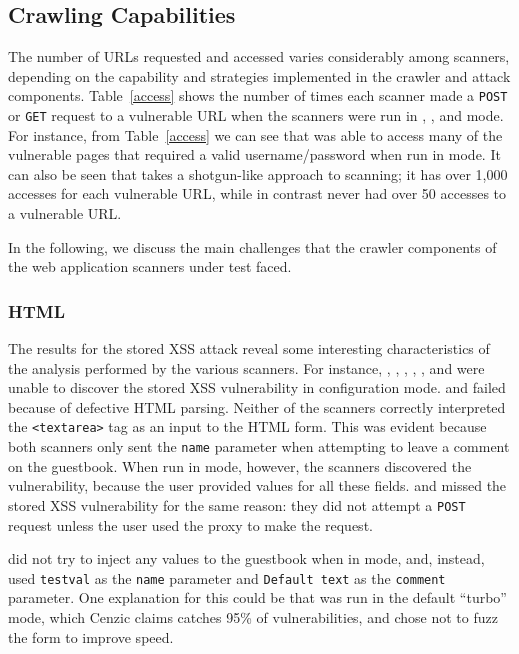 

\subsection{Crawling Capabilities}
\label{crawling}

The number of URLs requested and accessed varies considerably among scanners,
depending on the capability and strategies implemented in the crawler and
attack components. Table~\ref{access} shows the number of times each scanner
made a {\tt POST} or {\tt GET} request to a vulnerable URL when the scanners
were run in \initial{}, \config{}, and \manual{} mode.
For instance, from
Table~\ref{access} we can see that \hailstorm{} was able to access many of the
vulnerable pages that required a valid username/password when run in \initial{} mode. It
can also be seen that \nstalker{} takes a shotgun-like approach to scanning;
it has over 1,000 accesses for each vulnerable URL, while in contrast
\grendelscan{} never had over 50 accesses to a vulnerable URL.  

In the following, we discuss the main challenges that the crawler components of the
web application scanners under test faced.


\subsubsection{HTML}
The results for the stored XSS attack reveal some interesting characteristics of
the analysis performed by the various scanners. For instance, \burp{}, \grendelscan{}, \hailstorm{},
\milescan{}, \nstalker{}, and \waf{} were unable to discover the stored XSS
vulnerability in \initial{} configuration mode. \burp{} and \nstalker{} failed
because of defective HTML parsing. Neither of the scanners correctly
interpreted the {\tt <textarea>} tag as an input to the HTML form. This
was evident because both scanners only sent the {\tt name} parameter when
attempting to leave a comment on the guestbook. When run in \manual{} mode,
however, the scanners discovered the
vulnerability, because the user provided values for all these fields. 
\grendelscan{} and \milescan{} missed the stored XSS vulnerability for
the same reason: they did not attempt a {\tt POST}
request unless the user used the proxy to make the request. 

\hailstorm{} did not try to inject any values to the guestbook when in
\initial{} mode, and, instead, used {\tt testval} as the {\tt name} parameter
and {\tt Default text} as the {\tt comment} parameter. One explanation for
this could be that \hailstorm{} was run in the default ``turbo'' mode, which
Cenzic claims catches 95\% of vulnerabilities, and chose not to fuzz
the form to improve speed.

